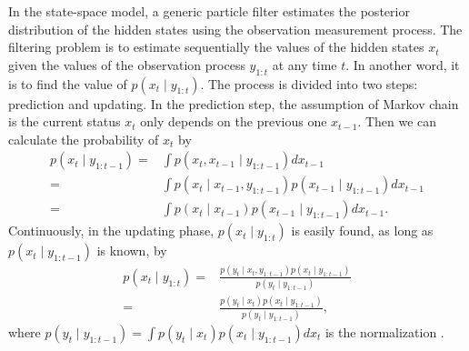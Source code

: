 In the state-space model, a generic particle filter estimates the posterior distribution of the hidden states using the observation measurement process. The filtering problem is to estimate sequentially the values of the hidden states $x_t$ given the values of the observation process $y_{1:t}$ at any time $t$. In another word, it is to find the value of $p(x_t  \mid  y_{1:t})$. The process is divided into two steps: prediction and updating. In the prediction step, the assumption of Markov chain is the current status $x_t $ only depends on the previous one $x_{t-1}$. Then we can calculate the probability of $x_t$ by 
\begin{equation}
\begin{split}
p(x_t \mid y_{1:t-1})=&\int p(x_t ,x_{t-1}\mid y_{1:t-1}) dx_{t-1}\\
=&\int p(x_t \mid x_{t-1},y_{1:t-1}) p(x_{t-1}\mid y_{1:t-1})dx_{t-1}\\
=&\int p(x_t \mid x_{t-1}) p(x_{t-1}\mid y_{1:t-1})dx_{t-1}.
\end{split}
\end{equation}
Continuously, in the updating phase, $p(x_t \mid y_{1:t})$ is easily found, as long as $p(x_t \mid y_{1:t-1})$ is known, by
\begin{equation}
\begin{split}
p(x_t \mid y_{1:t})=&\frac{p(y_t \mid x_t ,y_{1:t-1})p(x_{t}\mid y_{1:t-1})}{p(y_t \mid  y_{1:t-1})} \\
=&\frac{p(y_t \mid x_t )p(x_{t}\mid y_{1:t-1})}{p(y_t \mid  y_{1:t-1})},
\end{split}
\end{equation}
where $p(y_t \mid  y_{1:t-1})=\int p(y_t \mid x_t )p(x_t \mid  y_{1:t-1}) dx_t$ is  the normalization \citep{arulampalam2002tutorial}.

